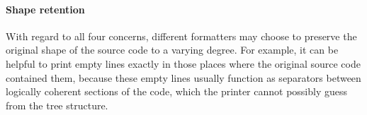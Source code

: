 \vspace{1cm} \paragraph{Shape retention}
With regard to all four concerns,
different formatters may choose to preserve
the original shape of the source code to a varying degree.
For example, it can be helpful to print empty lines
exactly in those places where the original source code contained them,
\autocite[Section: Empty lines]{prettierRationale}
because these empty lines usually function as
separators between logically coherent sections of the code,
which the printer cannot possibly guess from the tree structure.

